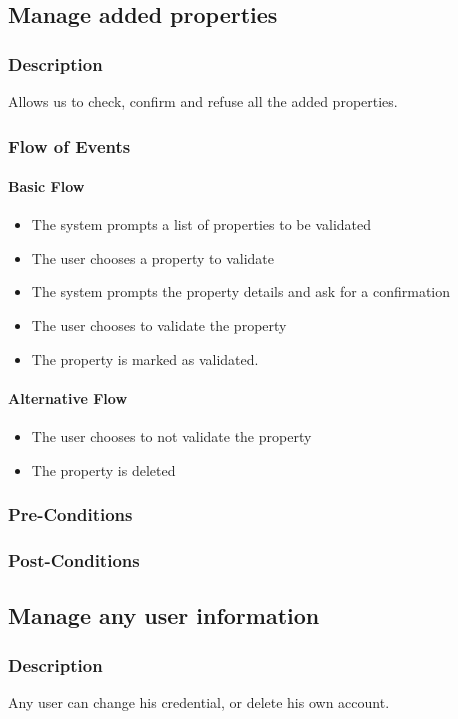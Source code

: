 \documentclass[a4paper,12pt]{article}
\begin{document}
\subsection{Manage added properties}
\subsubsection{Description}
Allows us to check, confirm and refuse all the added properties.
\subsubsection{Flow of Events}
\paragraph{Basic Flow}
\begin{itemize}
\item The system prompts a list of properties to be validated
\item The user chooses a property to validate
\item The system prompts the property details and ask for a confirmation
\item The user chooses to validate the property
\item The property is marked as validated.
\end{itemize}

\paragraph{Alternative Flow}
\begin{itemize}
\item The user chooses to not validate the property
\item The property is deleted
\end{itemize}

\subsubsection{Pre-Conditions}
\subsubsection{Post-Conditions}

\subsection{Manage any user information}
\subsubsection{Description}
Any user can change his credential, or delete his own account.
\end{document}
